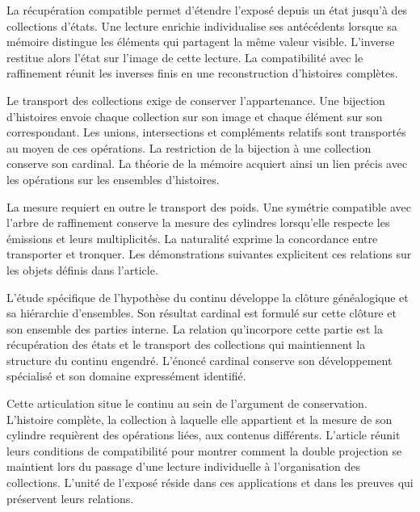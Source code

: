 
La récupération compatible permet d’étendre l’exposé depuis
un état jusqu’à des collections d’états. Une lecture enrichie
individualise ses antécédents lorsque sa mémoire distingue les
éléments qui partagent la même valeur visible. L’inverse
restitue alors l’état sur l’image de cette lecture.
La compatibilité avec le raffinement réunit les inverses finis
en une reconstruction d’histoires complètes.

Le transport des collections exige de conserver l’appartenance. Une
bijection d’histoires envoie chaque collection sur son image et chaque
élément sur son correspondant. Les unions, intersections et
compléments relatifs sont transportés au moyen de ces opérations.
La restriction de la bijection à une collection conserve son cardinal.
La théorie de la mémoire acquiert ainsi un lien précis avec les
opérations sur les ensembles d’histoires.

La mesure requiert en outre le transport des poids. Une symétrie compatible avec l'arbre de raffinement conserve la mesure des cylindres lorsqu'elle respecte les émissions et leurs multiplicités. La naturalité exprime la concordance entre transporter et tronquer. Les démonstrations suivantes explicitent ces relations sur les objets définis dans l'article.

L’étude spécifique de l’hypothèse du continu développe
la clôture généalogique et sa hiérarchie d’ensembles. Son résultat
cardinal est formulé sur cette clôture et son ensemble des parties interne.
La relation qu’incorpore cette partie est la récupération des
états et le transport des collections qui maintiennent la structure
du continu engendré. L’énoncé cardinal conserve son
développement spécialisé et son domaine expressément identifié.

Cette articulation situe le continu au sein de l’argument de
conservation. L’histoire complète, la collection à laquelle elle appartient
et la mesure de son cylindre requièrent des opérations liées,
aux contenus différents. L’article réunit leurs conditions de
compatibilité pour montrer comment la double projection se maintient
lors du passage d’une lecture individuelle à l’organisation des collections.
L’unité de l’exposé réside dans ces applications et dans les preuves
qui préservent leurs relations.
